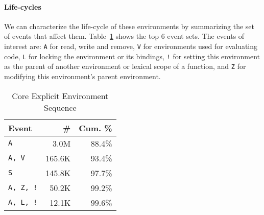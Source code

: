\documentclass[10pt,review,sigplan,anonymous=true,authorversion=true,nonacm=true]{acmart}
\begin{document}
\paragraph{Life-cycles}
We can characterize the life-cycle of these environments by summarizing the set
of events that affect them. Table~\ref{table:core_explicit_env_seq} shows the
top 6 event sets. The events of interest are: \texttt{A} for read, write and
remove, \texttt{V} for environments used for evaluating code, \texttt{L} for
locking the environment or its bindings, \texttt{!} for setting this environment
as the parent of another environment or lexical scope of a function, and
\texttt{Z} for modifying this environment's parent environment.

\begin{table}[!h]
  \vspace{-3mm}
  \small
  \caption{Core Explicit Environment Sequence} \label{table:core_explicit_env_seq}
  \centering
  \begin{tabular}{lrr}
    \toprule
    \textbf{Event}&\textbf{\#}&\textbf{Cum. \%}\\
    \midrule
    \texttt{A}&3.0M&88.4\%\\
    \texttt{A, V}&165.6K&93.4\%\\
    \texttt{S}&145.8K&97.7\%\\
    \texttt{A, Z, !}&50.2K&99.2\%\\
    \texttt{A, L, !}&12.1K&99.6\%\\
    \bottomrule
  \end{tabular}
\end{table}
\end{document}
